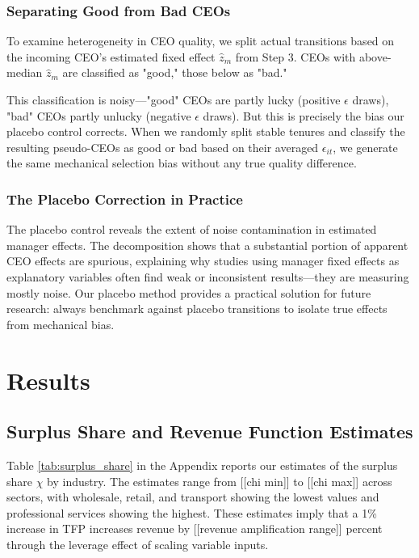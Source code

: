 \documentclass[11pt,a4paper]{article}
\begin{document}
\subsubsection{Separating Good from Bad CEOs}

To examine heterogeneity in CEO quality, we split actual transitions based on the incoming CEO's estimated fixed effect $\hat{z}_m$ from Step 3. CEOs with above-median $\hat{z}_m$ are classified as "good," those below as "bad."

This classification is noisy—"good" CEOs are partly lucky (positive $\epsilon$ draws), "bad" CEOs partly unlucky (negative $\epsilon$ draws). But this is precisely the bias our placebo control corrects. When we randomly split stable tenures and classify the resulting pseudo-CEOs as good or bad based on their averaged $\epsilon_{it}$, we generate the same mechanical selection bias without any true quality difference.

\subsubsection{The Placebo Correction in Practice}

The placebo control reveals the extent of noise contamination in estimated manager effects. The decomposition shows that a substantial portion of apparent CEO effects are spurious, explaining why studies using manager fixed effects as explanatory variables often find weak or inconsistent results—they are measuring mostly noise. Our placebo method provides a practical solution for future research: always benchmark against placebo transitions to isolate true effects from mechanical bias.

\section{Results}

\subsection{Surplus Share and Revenue Function Estimates}

Table \ref{tab:surplus_share} in the Appendix reports our estimates of the surplus share $\chi$ by industry. The estimates range from [[chi min]] to [[chi max]] across sectors, with wholesale, retail, and transport showing the lowest values and professional services showing the highest. These estimates imply that a 1\% increase in TFP increases revenue by [[revenue amplification range]] percent through the leverage effect of scaling variable inputs.
\end{document}
